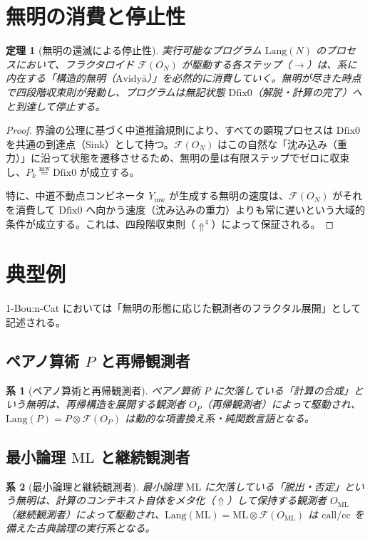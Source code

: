 \documentclass[11pt]{article}
\newcommand{\F}{\mathcal{F}}
\newcommand{\Lang}{\text{Lang}}
\newcommand{\Avidya}{\text{Avidyā}}
\newcommand{\Dfix}{\text{Dfix0}}
\newcommand{\metanegation}{\Uparrow}
\newcommand{\mw}{\stackrel{\text{mw}}{=}}
\newcommand{\Rmw}{Y_{\text{mw}}}
\newtheorem{theorem}{定理}
\newtheorem{corollary}{系}
\begin{document}
\section{無明の消費と停止性}

\begin{theorem}[無明の還滅による停止性]
実行可能なプログラム $\Lang(N)$ のプロセスにおいて、フラクタロイド $\F(O_N)$ が駆動する各ステップ（$\to$）は、系に内在する「構造的無明（$\Avidya$）」を必然的に消費していく。無明が尽きた時点で四段階収束則が発動し、プログラムは無記状態 $\Dfix$（解脱・計算の完了）へと到達して停止する。
\end{theorem}

\begin{proof}
界論の公理に基づく中道推論規則により、すべての顕現プロセスは $\Dfix$ を共通の到達点（Sink）として持つ。$\F(O_N)$ はこの自然な「沈み込み（重力）」に沿って状態を遷移させるため、無明の量は有限ステップでゼロに収束し、$P_k \mw \Dfix$ が成立する。

特に、中道不動点コンビネータ $\Rmw$ が生成する無明の速度は、$\F(O_N)$ がそれを消費して $\Dfix$ へ向かう速度（沈み込みの重力）よりも常に遅いという大域的条件が成立する。これは、四段階収束則（$\metanegation^4$）によって保証される。
\end{proof}

\section{典型例}

1-Bou:n-Cat においては「無明の形態に応じた観測者のフラクタル展開」として記述される。

\subsection{ペアノ算術 $P$ と再帰観測者}

\begin{corollary}[ペアノ算術と再帰観測者]
ペアノ算術 $P$ に欠落している「計算の合成」という無明は、再帰構造を展開する観測者 $O_P$（再帰観測者）によって駆動され、$\Lang(P) = P \otimes \F(O_P)$ は動的な項書換え系・純関数言語となる。
\end{corollary}

\subsection{最小論理 $\mathrm{ML}$ と継続観測者}

\begin{corollary}[最小論理と継続観測者]
最小論理 $\mathrm{ML}$ に欠落している「脱出・否定」という無明は、計算のコンテキスト自体をメタ化（$\metanegation$）して保持する観測者 $O_{\mathrm{ML}}$（継続観測者）によって駆動され、$\Lang(\mathrm{ML}) = \mathrm{ML} \otimes \F(O_{\mathrm{ML}})$ は $\mathrm{call/cc}$ を備えた古典論理の実行系となる。
\end{corollary}
\end{document}
